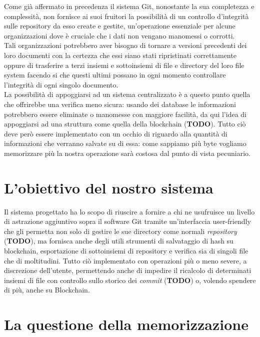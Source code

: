 
Come già affermato in precedenza il sistema Git,
nonostante la sua completezza e complessità,
non fornisce ai suoi fruitori la possibilità di un controllo d’integrità
sulle repository da esso create e gestite, un’operazione essenziale per
alcune organizzazioni dove è cruciale che i dati non vengano manomessi o corrotti. \\
Tali organizzazioni potrebbero aver bisogno di tornare a versioni precedenti
dei loro documenti con la certezza che essi siano stati ripristinati
correttamente oppure di trasferire a terzi insiemi e sottoinsiemi
di file e directory del loro file system facendo si che questi ultimi
possano in ogni momento controllare l’integrità di ogni singolo documento. \\
La possibilità di appoggiarsi ad un sistema centralizzato è a questo punto quella
che offrirebbe una verifica meno sicura: usando dei database le informazioni
potrebbero essere eliminate o manomesse con maggiore facilità,
da qui l’idea di appoggiarsi ad una struttura come quella della blockchain (\textbf{TODO}).
Tutto ciò deve però essere implementato con un occhio di riguardo alla quantità
di informazioni che verranno salvate su di essa: come sappiamo più byte vogliamo
memorizzare più la nostra operazione sarà costosa dal punto di vista pecuniario.

\section{L’obiettivo del nostro sistema}

Il sistema progettato ha lo scopo di riuscire a fornire a chi ne usufruisce
un livello di astrazione aggiuntivo sopra il software Git tramite un’interfaccia
user-friendly che gli permetta non solo di gestire le sue directory come normali
\emph{repository} (\textbf{TODO}), ma fornisca anche degli utili strumenti di
salvataggio di hash su blockchain, esportazione di sottoinsiemi di repository
e verifica sia di singoli file che di moltitudini.
Tutto ciò implementato con operazioni più o meno severe, a discrezione dell’utente,
permettendo anche di impedire il ricalcolo di determinati insiemi di file con controllo
sullo storico dei \emph{commit} (\textbf{TODO}) o, volendo spendere di più, anche su Blockchain.

\section{La questione della memorizzazione}

